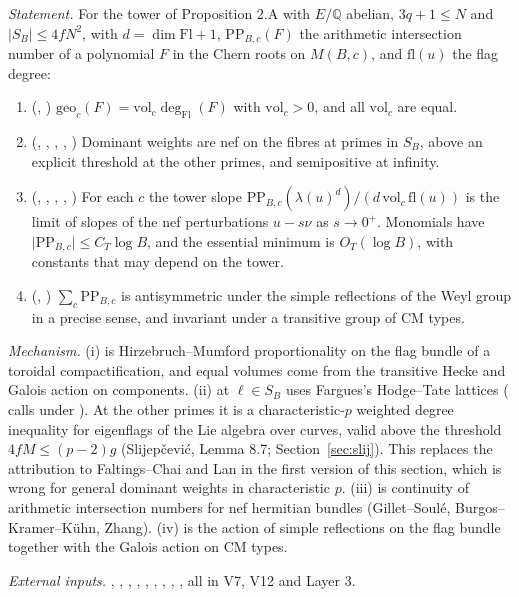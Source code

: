 \documentclass[11pt]{article}
\theoremstyle{remark}
\begin{document}
\emph{Statement.} For the tower of Proposition 2.A with $E/\mathbb Q$ abelian, $3q+1\le N$ and $\lvert S_B\rvert\le4fN^2$, with $d=\dim\mathrm{Fl}+1$, $\mathrm{PP}_{B,c}(F)$ the arithmetic intersection number of a polynomial $F$ in the Chern roots on $M(B,c)$, and $\mathrm{fl}(u)$ the flag degree:
\begin{enumerate}[label=(\roman*),nosep]
\item (, ) $\mathrm{geo}_c(F)=\mathrm{vol}_c\deg_{\mathrm{Fl}}(F)$ with $\mathrm{vol}_c>0$, and all $\mathrm{vol}_c$ are equal.
\item (, , , , ) Dominant weights are nef on the fibres at primes in $S_B$, above an explicit threshold at the other primes, and semipositive at infinity.
\item (, , , , ) For each $c$ the tower slope $\mathrm{PP}_{B,c}(\lambda(u)^d)/(d\,\mathrm{vol}_c\,\mathrm{fl}(u))$ is the limit of slopes of the nef perturbations $u-s\nu$ as $s\to0^+$. Monomials have $\lvert\mathrm{PP}_{B,c}\rvert\le C_T\log B$, and the essential minimum is $O_T(\log B)$, with constants that may depend on the tower.
\item (, ) $\sum_c\mathrm{PP}_{B,c}$ is antisymmetric under the simple reflections of the Weyl group in a precise sense, and invariant under a transitive group of CM types.
\end{enumerate}

\emph{Mechanism.} (i) is Hirzebruch--Mumford proportionality on the flag bundle of a toroidal compactification, and equal volumes come from the transitive Hecke and Galois action on components. (ii) at $\ell\in S_B$ uses Fargues's Hodge--Tate lattices ( calls  under ). At the other primes it is a characteristic-$p$ weighted degree inequality for eigenflags of the Lie algebra over curves, valid above the threshold $4fM\le(p-2)g$ (Slijepčević, Lemma 8.7; Section~\ref{sec:slij}). This replaces the attribution to Faltings--Chai and Lan in the first version of this section, which is wrong for general dominant weights in characteristic $p$. (iii) is continuity of arithmetic intersection numbers for nef hermitian bundles (Gillet--Soulé, Burgos--Kramer--Kühn, Zhang). (iv) is the action of simple reflections on the flag bundle together with the Galois action on CM types.

\emph{External inputs.} , , , , , , , , , all in V7, V12 and Layer 3.
\end{document}
